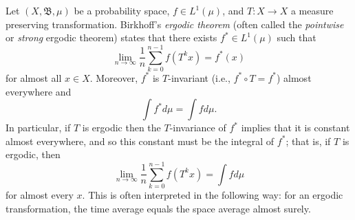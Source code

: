 \documentclass[12pt]{article}
\newcommand{\borel}{\mathfrak{B}}
\begin{document}
Let $(X, \borel, \mu)$ be a probability space, $f \in L^1(\mu)$, and $T\colon X \to X$ a measure preserving transformation.  Birkhoff's \emph{ergodic theorem} (often called the \emph{pointwise} or \emph{strong} ergodic theorem) states that there exists $f^*\in L^1(\mu)$ such that
\begin{equation*}
\lim_{n\to\infty}\frac{1}{n}\sum_{k=0}^{n-1} f(T^k x) = f^*(x)
\end{equation*}
for almost all $x\in X$. Moreover, $f^*$ is $T$-invariant (i.e., $f^*\circ T = f^*$) almost everywhere and $$\int f^*d\mu = \int f d\mu.$$ 
In particular, if $T$ is ergodic then the $T$-invariance of $f^*$ implies that it is constant almost everywhere, and so this constant must be the integral of $f^*$; that is, if $T$ is ergodic, then 
$$\lim_{n\to\infty}\frac{1}{n}\sum_{k=0}^{n-1} f(T^k x) = \int fd\mu$$ 
for almost every $x$. This is often interpreted in the following way: for an ergodic transformation, the time average equals the space average almost surely.
\end{document}
